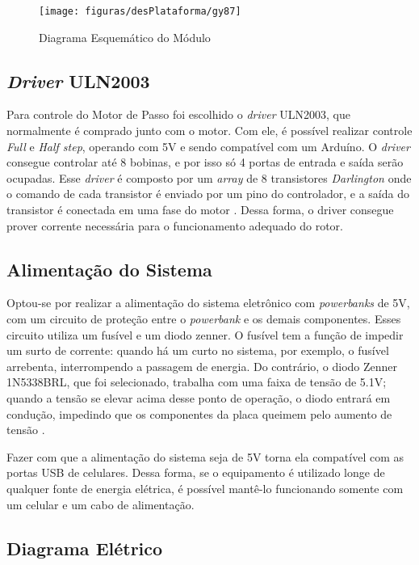 \begin{figure}[!htb]
	\centering
	\caption{Diagrama Esquemático do Módulo}
	\texttt{[image: figuras/desPlataforma/gy87]}
	\label{fig:gy87}
\end{figure}

\subsection{\textit{Driver} ULN2003}
Para controle do Motor de Passo foi escolhido o \textit{driver} ULN2003, que normalmente é comprado junto com o motor. Com ele, é possível realizar controle \textit{Full} e \textit{Half step}, operando com 5V e sendo compatível com um Arduíno. O \textit{driver} consegue controlar até 8 bobinas, e por isso só 4 portas de entrada e saída serão ocupadas. Esse \textit{driver} é composto por um \textit{array} de 8 transistores \textit{Darlington} onde o comando de cada transistor é enviado por um pino do controlador, e a saída do transistor é conectada em uma fase do motor . Dessa forma, o driver consegue prover corrente necessária para o funcionamento adequado do rotor\cite{man:ulndriver}.

\subsection{Alimentação do Sistema}
Optou-se por realizar a alimentação do sistema eletrônico com \textit{powerbanks} de 5V, com um circuito de proteção entre o \textit{powerbank} e os demais componentes. Esses circuito utiliza um fusível e um diodo zenner. O fusível tem a função de impedir um surto de corrente: quando há um curto no sistema, por exemplo, o fusível arrebenta, interrompendo a passagem de energia. Do contrário, o diodo Zenner 1N5338BRL, que foi selecionado, trabalha com uma faixa de tensão de 5.1V; quando a tensão se elevar acima desse ponto de operação, o diodo entrará em condução, impedindo que os componentes da placa queimem pelo aumento de tensão \cite{man:diodozenner}. 

Fazer com que a alimentação do sistema seja de 5V torna ela compatível com as portas USB de celulares. Dessa forma, se o equipamento é utilizado longe de qualquer fonte de energia elétrica, é possível mantê-lo funcionando somente com um celular e um cabo de alimentação. 

\subsection{Diagrama Elétrico}

